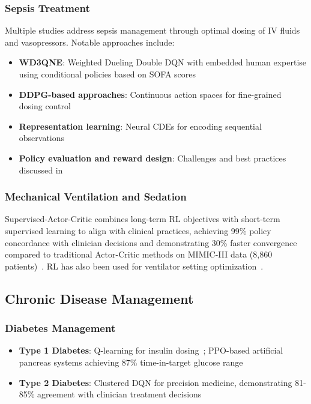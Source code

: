 \documentclass[runningheads]{llncs}
\begin{document}
\subsubsection{Sepsis Treatment}
Multiple studies address sepsis management through optimal dosing of IV fluids and vasopressors. Notable approaches include:
\begin{itemize}
    \item \textbf{WD3QNE}: Weighted Dueling Double DQN with embedded human expertise using conditional policies based on SOFA scores~\cite{wuValuebasedDeepReinforcement2023}
    \item \textbf{DDPG-based approaches}: Continuous action spaces for fine-grained dosing control~\cite{linDosingStrategyModel2022}
    \item \textbf{Representation learning}: Neural CDEs for encoding sequential observations~\cite{killianEmpiricalStudyRepresentation2020}
    \item \textbf{Policy evaluation and reward design}: Challenges and best practices discussed in~\cite{luoReinforcementLearningDynamic2024,zhangReinforcementLearningClinical2019}
\end{itemize}

\subsubsection{Mechanical Ventilation and Sedation}
Supervised-Actor-Critic combines long-term RL objectives with short-term supervised learning to align with clinical practices, achieving 99\% policy concordance with clinician decisions and demonstrating 30\% faster convergence compared to traditional Actor-Critic methods on MIMIC-III data (8,860 patients)~\cite{yuSupervisedactorcriticReinforcementLearning2020}. RL has also been used for ventilator setting optimization~\cite{liuReinforcementLearningOptimize2024}.

\subsection{Chronic Disease Management}

\subsubsection{Diabetes Management}
\begin{itemize}
    \item \textbf{Type 1 Diabetes}: Q-learning for insulin dosing~\cite{javadReinforcementLearningBased2019}; PPO-based artificial pancreas systems achieving 87\% time-in-target glucose range~\cite{zhaoSafeenhancedFullyClosedloop2025}
    \item \textbf{Type 2 Diabetes}: Clustered DQN for precision medicine, demonstrating 81-85\% agreement with clinician treatment decisions~\cite{ohEffectiveDatadrivenPrecision2022}
\end{itemize}
\end{document}
